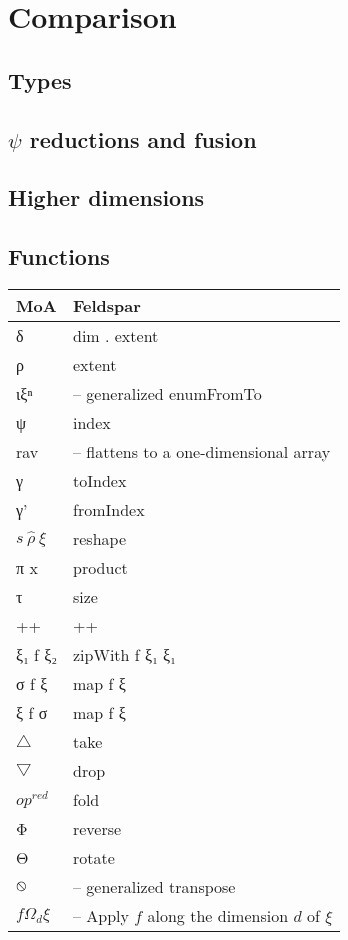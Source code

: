 \documentclass{sigplanconf}
\begin{document}
\section{Comparison}

\subsection{Types}

\subsection{\(\psi\) reductions and fusion}

\subsection{Higher dimensions}

\subsection{Functions}

\begin{tabular}{|@{}l|l@{}|}
\hline
MoA & Feldspar
\\
\hline
δ & dim . extent
\\
ρ & extent
\\
ιξⁿ & -- generalized enumFromTo
\\
ψ & index
\\
rav & -- flattens to a one-dimensional array
\\
γ & toIndex
\\
γ' & fromIndex
\\
$s \: \hat{ρ} \: ξ$ & reshape
\\
π x & product
\\
τ & size
\\
++ & ++
\\
ξ₁ f ξ₂ & zipWith f ξ₁ ξ₁
\\
σ f ξ & map f ξ
\\
ξ f σ & map f ξ
\\
$\bigtriangleup$ & take
\\
$\bigtriangledown$ & drop
\\
$op^{red}$ & fold
\\
Φ & reverse
\\
Θ & rotate
\\
$\varobslash$ & -- generalized transpose
\\
$f Ω_d ξ$ & -- Apply $f$ along the dimension $d$ of $ξ$
\\
\hline
\end{tabular}
\end{document}
